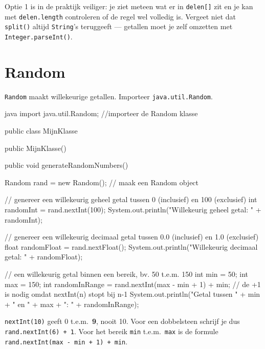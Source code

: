 \documentclass[a4paper,11pt]{article}
\begin{document}
\begin{examenbox}
    Optie 1 is in de praktijk veiliger: je ziet meteen wat er in \texttt{delen[]}
    zit en je kan met \texttt{delen.length} controleren of de regel wel volledig is.
    Vergeet niet dat \texttt{split()} altijd \texttt{String}'s teruggeeft --- getallen
    moet je zelf omzetten met \texttt{Integer.parseInt()}.
\end{examenbox}

\section{Random}

\texttt{Random} maakt willekeurige getallen. Importeer
\texttt{java.util.Random}.

\begin{codeblock}[random]{java}
    import java.util.Random; //importeer de Random klasse

    public class MijnKlasse
        {

            public MijnKlasse() {
                }

            public void generateRandomNumbers() {
                    Random rand = new Random(); // maak een Random object

                    // genereer een willekeurig geheel getal tussen 0 (inclusief) en 100 (exclusief)
                    int randomInt = rand.nextInt(100);
                    System.out.println("Willekeurig geheel getal: " + randomInt);

                    // genereer een willekeurig decimaal getal tussen 0.0 (inclusief) en 1.0 (exclusief)
                    float randomFloat = rand.nextFloat();
                    System.out.println("Willekeurig decimaal getal: " + randomFloat);

                    // een willekeurig getal binnen een bereik, bv. 50 t.e.m. 150
                    int min = 50;
                    int max = 150;
                    int randomInRange = rand.nextInt(max - min + 1) + min;
                    // de +1 is nodig omdat nextInt(n) stopt bij n-1
                    System.out.println("Getal tussen " + min + " en " + max + ": " + randomInRange);
                }
        }
\end{codeblock}

\begin{warningbox}
    \texttt{nextInt(10)} geeft 0 t.e.m.\ \textbf{9}, nooit 10. Voor een dobbelsteen
    schrijf je dus \texttt{rand.nextInt(6) + 1}. Voor het bereik
    \texttt{min} t.e.m.\ \texttt{max} is de formule
    \texttt{rand.nextInt(max - min + 1) + min}.
\end{warningbox}
\end{document}
